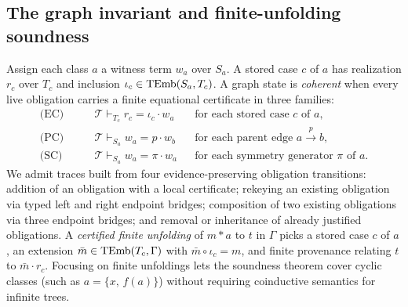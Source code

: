 \subsection{The graph invariant and finite-unfolding soundness}

Assign each class $a$ a witness term $w_a$ over $S_a$. A stored case $c$ of
$a$ has realization $r_c$ over $T_c$ and inclusion
$\iota_c\in\operatorname{TEmb}(S_a,T_c)$. A graph state is \emph{coherent} when every live
obligation carries a finite equational certificate in three families:
\begin{align}
 \text{(EC)}\qquad
 &\mathcal T\vdash_{T_c} r_c=\iota_c\cdot w_a
       &&\text{for each stored case }c\text{ of }a,\label{eq:EC}\\
 \text{(PC)}\qquad
 &\mathcal T\vdash_{S_a} w_a=p\cdot w_b
       &&\text{for each parent edge }a\xrightarrow{p}b,\label{eq:PC}\\
 \text{(SC)}\qquad
 &\mathcal T\vdash_{S_a} w_a=\pi\cdot w_a
       &&\text{for each symmetry generator }\pi\text{ of }a.\label{eq:SC}
\end{align}
We admit traces built from four evidence-preserving obligation transitions:
addition of an obligation with a local certificate; rekeying an existing
obligation via typed left and right endpoint bridges; composition of two
existing obligations via three endpoint bridges; and removal or inheritance of
already justified obligations. A \emph{certified finite unfolding} of $m*a$ to
$t$ in $\Gamma$ picks a stored case $c$ of $a$, an extension
$\bar m\in\operatorname{TEmb}(T_c,\Gamma)$ with $\bar m\circ\iota_c=m$, and finite provenance
relating $t$ to $\bar m\cdot r_c$. Focusing on finite unfoldings lets the
soundness theorem cover cyclic classes (such as $a=\{x,\,f(a)\}$) without
requiring coinductive semantics for infinite trees.

